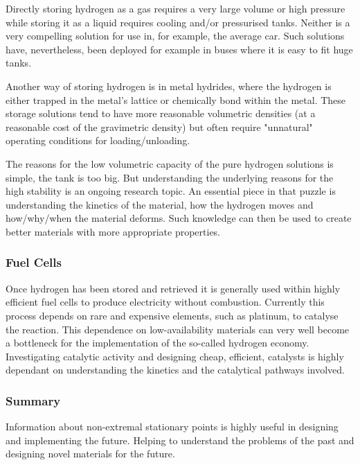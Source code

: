 Directly storing hydrogen as a gas requires a very large volume or high pressure while storing it as a liquid requires cooling and/or pressurised tanks.
Neither is a very compelling solution for use in, for example, the average car.
Such solutions have, nevertheless, been deployed for example in buses where it is easy to fit huge tanks.~\citemiss

Another way of storing hydrogen is in metal hydrides, where the hydrogen is either trapped in the metal's lattice or chemically bond within the metal.
These storage solutions tend to have more reasonable volumetric densities (at a reasonable cost of the gravimetric density)  but often require "unnatural" operating conditions for loading/unloading.

The reasons for the low volumetric capacity of the pure hydrogen solutions is simple, the tank is too big.
But understanding the underlying reasons for the high stability is an ongoing research topic.
An essential piece in that puzzle is understanding the kinetics of the material, how the hydrogen moves and how/why/when the material deforms.
Such knowledge can then be used to create better materials with more appropriate properties.

\subsubsection{Fuel Cells}
Once hydrogen has been stored and retrieved it is generally used within highly efficient fuel cells to produce electricity without combustion.\citemiss
Currently this process depends on rare and expensive elements, such as platinum, to catalyse the reaction.
This dependence on low-availability materials can very well become a bottleneck for the implementation of the so-called hydrogen economy.
Investigating catalytic activity and designing cheap, efficient, catalysts is highly dependant on understanding the kinetics and the catalytical pathways involved.

\subsubsection{Summary}
Information about non-extremal stationary points is highly useful in designing and implementing the future.
Helping to understand the problems of the past and designing novel materials for the future.





